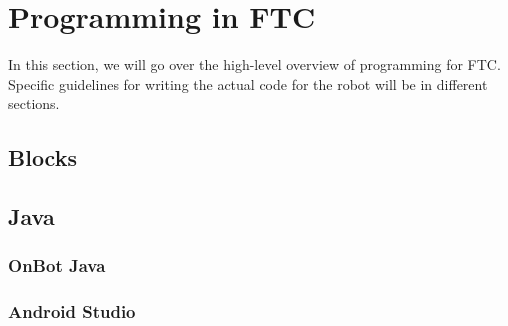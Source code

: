 \documentclass[../main.tex]{subfiles}
\begin{document}
\newpage
\section{Programming in FTC}

In this section, we will go over the high-level overview of programming for FTC. Specific guidelines for writing the actual code for the robot will be in different sections.
\subsection{Blocks}
\subsection{Java}
\subsubsection{OnBot Java}
\subsubsection{Android Studio}
\end{document}

